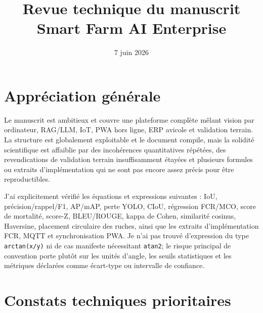 \documentclass[11pt,a4paper]{article}
\title{Revue technique du manuscrit\\\large Smart Farm AI Enterprise}
\author{}
\date{7 juin 2026}
\begin{document}
\maketitle

\section*{Appréciation générale}

Le manuscrit est ambitieux et couvre une plateforme complète mêlant vision par ordinateur, RAG/LLM, IoT, PWA hors ligne, ERP avicole et validation terrain. La structure est globalement exploitable et le document compile, mais la solidité scientifique est affaiblie par des incohérences quantitatives répétées, des revendications de validation terrain insuffisamment étayées et plusieurs formules ou extraits d'implémentation qui ne sont pas encore assez précis pour être reproductibles.

J'ai explicitement vérifié les équations et expressions suivantes : IoU, précision/rappel/F1, AP/mAP, perte YOLO, CIoU, régression FCR/MCO, score de mortalité, score-Z, BLEU/ROUGE, kappa de Cohen, similarité cosinus, Haversine, placement circulaire des ruches, ainsi que les extraits d'implémentation FCR, MQTT et synchronisation PWA. Je n'ai pas trouvé d'expression du type \texttt{arctan(x/y)} ni de cas manifeste nécessitant \texttt{atan2}; le risque principal de convention porte plutôt sur les unités d'angle, les seuils statistiques et les métriques déclarées comme écart-type ou intervalle de confiance.

\section*{Constats techniques prioritaires}
\end{document}
